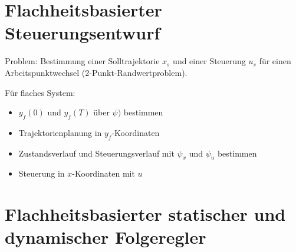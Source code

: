 \section{Flachheitsbasierter Steuerungsentwurf}
Problem: Bestimmung einer Solltrajektorie $x_s$ und einer Steuerung $u_s$ für einen
Arbeitspunktwechsel (2-Punkt-Randwertproblem).

Für flaches System:
\begin{itemize}
    \item $y_f(0)$ und $y_f(T)$ über $\psi)$ bestimmen
    \item Trajektorienplanung in $y_f$-Koordinaten
    \item Zustandsverlauf und Steuerungsverlauf mit $\psi_x$ und $\psi_u$ bestimmen
    \item Steuerung in $x$-Koordinaten mit $u$
\end{itemize}

\section{Flachheitsbasierter statischer und dynamischer Folgeregler}
